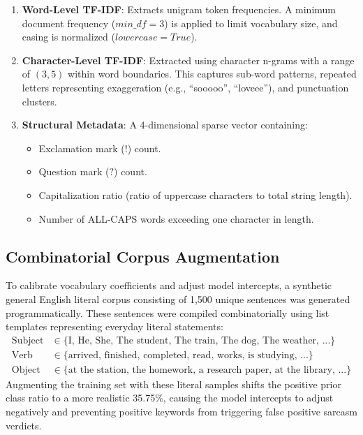 \documentclass[11pt,a4paper]{article}
\begin{document}
\begin{enumerate}
    \item \textbf{Word-Level TF-IDF}: Extracts unigram token frequencies. A minimum document frequency ($min\_df=3$) is applied to limit vocabulary size, and casing is normalized ($lowercase=True$).
    \item \textbf{Character-Level TF-IDF}: Extracted using character n-grams with a range of $(3, 5)$ within word boundaries. This captures sub-word patterns, repeated letters representing exaggeration (e.g., ``sooooo'', ``loveee''), and punctuation clusters.
    \item \textbf{Structural Metadata}: A 4-dimensional sparse vector containing:
    \begin{itemize}
        \item Exclamation mark ($!$) count.
        \item Question mark ($?$) count.
        \item Capitalization ratio (ratio of uppercase characters to total string length).
        \item Number of ALL-CAPS words exceeding one character in length.
    \end{itemize}
\end{enumerate}

\subsection{Combinatorial Corpus Augmentation}
To calibrate vocabulary coefficients and adjust model intercepts, a synthetic general English literal corpus consisting of 1,500 unique sentences was generated programmatically. These sentences were compiled combinatorially using list templates representing everyday literal statements:
\begin{align*}
\text{Subject} &\in \{\text{I, He, She, The student, The train, The dog, The weather, ...}\} \\
\text{Verb} &\in \{\text{arrived, finished, completed, read, works, is studying, ...}\} \\
\text{Object} &\in \{\text{at the station, the homework, a research paper, at the library, ...}\}
\end{align*}
Augmenting the training set with these literal samples shifts the positive prior class ratio to a more realistic 35.75\%, causing the model intercepts to adjust negatively and preventing positive keywords from triggering false positive sarcasm verdicts.
\end{document}
